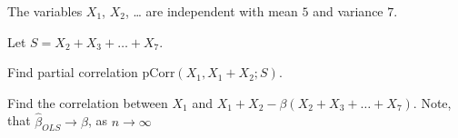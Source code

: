 
\begin{question}
The variables \(X_1\), \(X_2\), \ldots{} are independent with mean \(5\) and variance \(7\).

Let \(S = X_{2} + X_{3} + \ldots + X_{7}\).

Find partial correlation \(\mathrm{pCorr}(X_1, X_1 + X_2; S)\).
\end{question}

\begin{solution}
Find the correlation between \(X_1\) and \(X_1+X_2 - \beta (X_{2} + X_{3} + \ldots + X_{7})\). Note, that \(\hat{\beta}_{OLS} \to \beta\), as \(n\to \infty\)
\end{solution}

